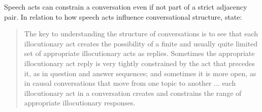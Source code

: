 \documentclass[11pt]{article}
\begin{document}
Speech acts can  constrain a conversation even if not part of a strict adjacency pair. 
In relation to how speech acts influence conversational structure,
\citet{searle1985foundations} state: \begin{quote}
    The key to understanding the structure of conversations is to see that each illocutionary act creates the possibility of a finite and usually quite limited set of appropriate illocutionary acts as replies.  Sometimes the appropriate illocutionary act reply is very tightly constrained by the act that precedes it, as in question and answer sequences; and sometimes it is more open, as in causal conversations that move from one topic to another ... each illocutionary act in a conversation creates and constrains the range of appropriate illocutionary responses.
\end{quote}   
 
\end{document}
